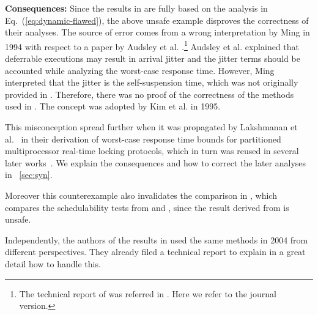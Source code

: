 
{\bf Consequences:} Since the results in \cite{ECRTS-AudsleyB04,RTAS-AudsleyB04,RTCSA-KimCPKH95,MingLiRTCSA1994} are fully based on the analysis in Eq.~(\ref{eq:dynamic-flawed}), the above unsafe example disproves the correctness of their analyses. The source of error comes from a wrong interpretation by Ming \cite{MingLiRTCSA1994} in 1994 with respect to a paper by Audsley et al. \cite{audsley-1993}.\footnote{The technical report of \cite{audsley-1993} was referred in \cite{MingLiRTCSA1994}. Here we refer to the journal version.} Audsley et al. \cite{audsley-1993} explained that deferrable executions may result in arrival jitter and the jitter terms should be accounted while analyzing the worst-case response time. However, Ming \cite{MingLiRTCSA1994} interpreted that the jitter is the self-suspension time, which was not originally provided in \cite{audsley-1993}. Therefore, there was no proof of the correctness of the methods used in \cite{MingLiRTCSA1994}. The concept was adopted by Kim et al. \cite{RTCSA-KimCPKH95} in 1995. 

This misconception spread further when it was propagated by Lakshmanan et al.~\cite{lakshmanan-2009} in their derivation of worst-case response time bounds for
partitioned multiprocessor real-time locking protocols, which in turn was reused in several later works~\cite{zeng-2011,bbb-2013,yang-2013,kim-2014,han-2014,carminati-2014,yang-2014}. We explain the consequences and how to correct the later analyses in \mysectionref{}~\ref{sec:syn}. 
 
Moreover this counterexample also invalidates the comparison in \cite{RidouardR06}, which compares the schedulability tests from \cite{RTCSA-KimCPKH95} and \cite[Page 164-165]{Liu:2000:RS:518501}, since the result derived from \cite{RTCSA-KimCPKH95} is unsafe.

Independently, the authors of the results in \cite{ECRTS-AudsleyB04,RTAS-AudsleyB04} used the same methods in 2004 from different perspectives. They already filed a technical report \cite{BletsasReport2015} to explain in a great detail how to handle this. 

